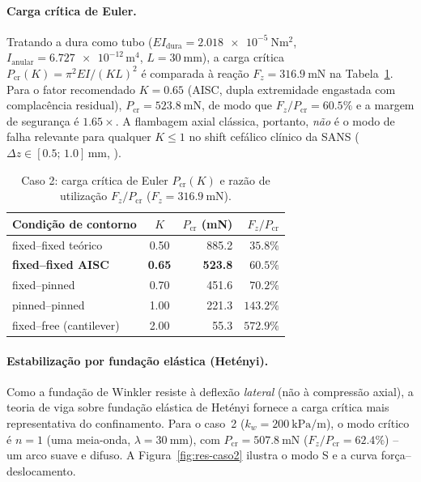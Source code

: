 \paragraph{Carga crítica de Euler.} Tratando a dura como tubo ($EI_{\mathrm{dura}} = \SI{2.018e-5}{\newton\meter\squared}$, $I_{\mathrm{anular}} = \num{6.727e-12}\,\si{\meter}^{4}$, $L = \SI{30}{\milli\meter}$), a carga crítica $P_{\mathrm{cr}}(K) = \pi^2 EI/(KL)^2$ é comparada à reação $F_z = \SI{316.9}{\milli\newton}$ na Tabela~\ref{tab:res-euler}. Para o fator recomendado $K = 0.65$ (AISC, dupla extremidade engastada com complacência residual), $P_{\mathrm{cr}} = \SI{523.8}{\milli\newton}$, de modo que $F_z/P_{\mathrm{cr}} = 60.5\%$ e a margem de segurança é $1.65\times$. A flambagem axial clássica, portanto, \emph{não} é o modo de falha relevante para qualquer $K \le 1$ no shift cefálico clínico da SANS ($\Delta z \in [0.5;\,1.0]\,\si{\milli\meter}$, \citealp{Lee2020NPJ}).

\begin{table}[h!]
\centering
\small
\caption{Caso 2: carga crítica de Euler $P_{\mathrm{cr}}(K)$ e razão de
utilização $F_z/P_{\mathrm{cr}}$ ($F_z = \SI{316.9}{\milli\newton}$).}
\label{tab:res-euler}
\begin{tabular}{l c r r}
\toprule
\textbf{Condição de contorno} & $K$ & $P_{\mathrm{cr}}$ (\si{\milli\newton}) & $F_z/P_{\mathrm{cr}}$ \\
\midrule
fixed--fixed teórico            & 0.50 & 885.2 & $35.8\%$ \\
\textbf{fixed--fixed AISC}      & \textbf{0.65} & \textbf{523.8} & \textbf{$60.5\%$} \\
fixed--pinned                   & 0.70 & 451.6 & $70.2\%$ \\
pinned--pinned                  & 1.00 & 221.3 & $143.2\%$ \\
fixed--free (cantilever)        & 2.00 & 55.3  & $572.9\%$ \\
\bottomrule
\end{tabular}
\end{table}

\paragraph{Estabilização por fundação elástica (Hetényi).} Como a fundação de Winkler resiste à deflexão \emph{lateral} (não à compressão axial), a teoria de viga sobre fundação elástica de Hetényi fornece a carga crítica mais representativa do confinamento. Para o caso~2 ($k_w = \SI{200}{\kilo\pascal\per \meter}$), o modo crítico é $n = 1$ (uma meia-onda, $\lambda = \SI{30}{\milli\meter}$), com $P_{\mathrm{cr}} = \SI{507.8}{\milli\newton}$ ($F_z/P_{\mathrm{cr}} = 62.4\%$) -- um arco suave e difuso. A Figura~\ref{fig:res-caso2} ilustra o modo S e a curva força--deslocamento.

